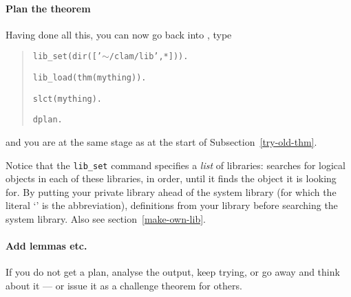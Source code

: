 \documentclass{article}
\begin{document}
\paragraph {Plan the theorem}
Having done all this, you can now go back into \clam, type
\begin{verse}
{\tt lib\_set(dir(['$\sim$/clam/lib',*])).}

{\tt lib\_load(thm(mything)).} 

{\tt slct(mything).}

{\tt dplan.}
\end{verse}
and you are at the same stage as at the
start of Subsection~\ref{try-old-thm}. 

Notice that the {\tt lib\_set} command specifies a {\em list\/} of
libraries: \clam searches for logical objects in each of these
libraries, in order, until it finds the object it is looking for.  By
putting your private library ahead of the system library (for which
the literal `{\tt *}' is the abbreviation), \clam  definitions from
your library before searching the system library.  Also see
section~\ref{make-own-lib}.

\paragraph {Add lemmas etc.}
If you do not get a plan, analyse the
output, keep trying, or go away and think about it --- or issue it as a
challenge theorem for others.
\end{document}
